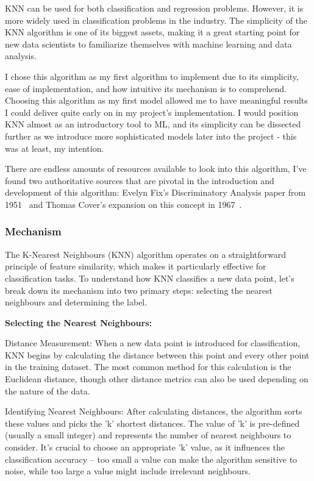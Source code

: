 \documentclass[letterpaper,10pt]{article}
\begin{document}
KNN can be used for both classification and regression problems. However, it is more widely used in classification problems in the industry. The simplicity of the KNN algorithm is one of its biggest assets, making it a great starting point for new data scientists to familiarize themselves with machine learning and data analysis. \par
I chose this algorithm as my first algorithm to implement due to its simplicity, ease of implementation, and how intuitive its mechanism is to comprehend. Choosing this algorithm as my first model allowed me to have meaningful results I could deliver quite early on in my project's implementation. I would position KNN almost as an introductory tool to ML, and its simplicity can be dissected further as we introduce more sophisticated models later into the project - this was at least, my intention. \par
There are endless amounts of resources available to look into this algorithm, I've found two authoritative sources that are pivotal in the introduction and development of this algorithm: Evelyn Fix's Discriminatory Analysis paper from 1951~\cite{NNEFixHodges} and Thomas Cover's expansion on this concept in 1967~\cite{NNCoverHart}.

\subsubsection{Mechanism}
The K-Nearest Neighbours (KNN) algorithm operates on a straightforward principle of feature similarity, which makes it particularly effective for classification tasks. To understand how KNN classifies a new data point, let's break down its mechanism into two primary steps: selecting the nearest neighbours and determining the label. \par

\textbf{Selecting the Nearest Neighbours:}

Distance Measurement: When a new data point is introduced for classification, KNN begins by calculating the distance between this point and every other point in the training dataset. The most common method for this calculation is the Euclidean distance, though other distance metrics can also be used depending on the nature of the data.

Identifying Nearest Neighbours: After calculating distances, the algorithm sorts these values and picks the 'k' shortest distances. The value of 'k' is pre-defined (usually a small integer) and represents the number of nearest neighbours to consider. It's crucial to choose an appropriate 'k' value, as it influences the classification accuracy – too small a value can make the algorithm sensitive to noise, while too large a value might include irrelevant neighbours.
\end{document}
